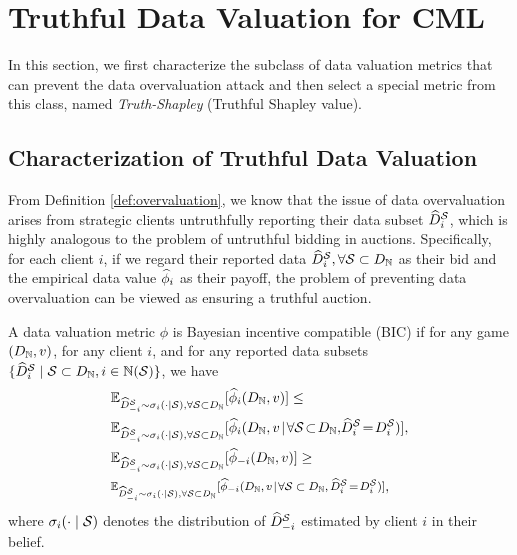 

\section{Truthful Data Valuation for CML}
In this section, we first characterize the subclass of data valuation metrics that can prevent the data overvaluation attack and then select a special metric from this class, named \textit{Truth-Shapley} (Truthful Shapley value). 

\subsection{Characterization of Truthful Data Valuation}
From Definition \ref{def:overvaluation}, we know that the issue of data overvaluation arises from strategic clients untruthfully reporting their data subset $\widehat{D}^{\mathcal{S}}_{i}$, which is highly analogous to the problem of untruthful bidding in auctions. 
Specifically, for each client $i$, if we regard their reported data $\widehat{D}^{\mathcal{S}}_{i}, \forall \mathcal{S} \subset D_{\mathbb{N}}$ as their bid and the empirical data value $\widehat{\phi}_i$ as their payoff, the problem of preventing data overvaluation can be viewed as ensuring a truthful auction. 

\begin{definition}
\label{def:truthfulness}
    A data valuation metric $\phi$ is Bayesian incentive compatible (BIC) if for any game $(D_{\mathbb{N}}, v)$, for any client $i$, and for any reported data subsets $\{\widehat{D}^{\mathcal{S}}_{i}\mid \mathcal{S} \subset D_{\mathbb{N}}, i \in \mathbb{N}(\mathcal{S}) \}$, we have
    \begin{align}
    \label{formula:expected_data_value_i}
        &\mathbb{E}_{\reportedstominusi \sim \sigma_i(\cdot \mid \datasubset), \forall \datasubset \subset \granddataset}[\empiricaldatavalue_{i}(\granddataset, v)] \leq \\
        \label{formula:expected_data_value_i_max}
         & \mathbb{E}_{\reportedstominusi \sim \sigma_i(\cdot \mid \datasubset), \forall \datasubset \subset \granddataset}[\empiricaldatavalue_{i}(\granddataset, v \!\mid\! \forall \datasubset \!\subset \!\granddataset,\! \reportedstoi\! =  \!\stoi)],\\
        \label{formula:expected_data_value_minusi}
        &\mathbb{E}_{\reportedstominusi \sim \sigma_i(\cdot \mid \datasubset), \forall \datasubset \subset \granddataset}[\empiricaldatavalue_{-i}(\granddataset, v)] \geq\\
        \label{formula:expected_data_value_minusi_max}
         & \medmath{\mathbb{E}_{\reportedstominusi \sim \sigma_i(\cdot \mid \datasubset), \forall \datasubset \subset \granddataset}[\empiricaldatavalue_{-i}(\granddataset, v \!\mid \!\forall \datasubset \subset \granddataset, \reportedstoi \!= \! \stoi)]},
    \end{align}
    where $\sigma_i(\cdot \mid \mathcal{S})$ denotes the distribution of $\widehat{D}^{\mathcal{S}}_{-i}$ estimated by client $i$ in their belief.
\end{definition}

